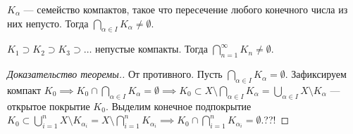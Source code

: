 \begin{theorem}
    $K_\alpha$ --- семейство компактов, такое что пересечение любого конечного числа из них непусто. Тогда  $\bigcap_{\alpha \in I} K_\alpha \neq \emptyset$.
\end{theorem}
\begin{consequence}
    $K_1 \supset K_2 \supset K_3 \supset \ldots$ непустые компакты. Тогда $\bigcap\limits_{n=1}^\infty K_n \neq \emptyset$.
\end{consequence}
\begin{proof}[Доказательство теоремы.]
    От противного. Пусть $\bigcap\limits_{\alpha \in I} K_\alpha = \emptyset$. Зафиксируем компакт  $K_0 \implies K_0 \cap \bigcap\limits_{\alpha \in I} K_\alpha = \emptyset \implies K_0 \subset X \setminus \bigcap\limits_{\alpha \in I} K_\alpha = \bigcup_{\alpha \in I} X \setminus K_\alpha$ --- открытое покрытие  $K_0$. Выделим конечное подпокрытие  $K_0 \subset \bigcup\limits_{i=1}^n X \setminus K_{\alpha_i} = X \setminus \bigcap\limits_{i=1}^n K_{\alpha_i} \implies K_0 \cap \bigcap\limits_{i=1}^n K_{\alpha_i} = \emptyset$.??!
\end{proof}
